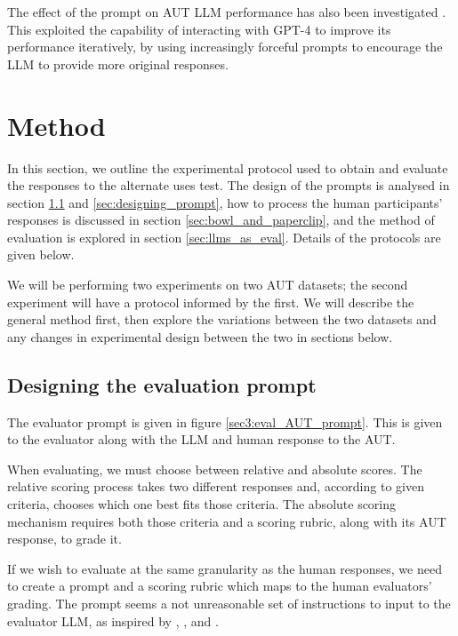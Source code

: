 \documentclass{article}
\begin{document}
The effect of the prompt on AUT LLM performance has also been investigated \citet{goes2023pushing}. This exploited the capability of interacting with GPT-4 to improve its performance iteratively, by using increasingly forceful prompts to encourage the LLM to provide more original responses. 

\section{Method}
\label{sec:method}

In this section, we outline the experimental protocol  used to obtain and evaluate the responses to the alternate uses test. The design of the prompts is analysed in section \ref{sec:design_eval_prompt} and  \ref{sec:designing_prompt}, how to process the human participants' responses is discussed in section \ref{sec:bowl_and_paperclip}, and the method of evaluation is explored in section \ref{sec:llms_as_eval}. Details of the protocols are given below. 

We will be performing two experiments on two AUT datasets; the second experiment will have a protocol informed by the first. We will describe the general method first, then explore the variations between the two datasets and any changes in experimental design between the two in sections below. 

\subsection{Designing the evaluation prompt}
\label{sec:design_eval_prompt}

The evaluator prompt is given in figure \ref{sec3:eval_AUT_prompt}. This is given to the evaluator along with the LLM and human response to the AUT. 

When evaluating, we must choose between relative and absolute scores. The relative scoring process takes two different responses and, according to given criteria, chooses which one best fits those criteria. The absolute scoring mechanism requires both those criteria and a scoring rubric, along with its AUT response, to grade it. 

If we wish to evaluate at the same granularity as the human responses, we need to create a prompt and a scoring rubric which maps to the human evaluators' grading. The prompt seems a not unreasonable set of instructions to input to the evaluator LLM, as inspired by \cite{zhao2024assessing}, \cite{creativehuddle}, and \cite{zhao2024assessingunderstandingcreativitylarge}.
\end{document}
